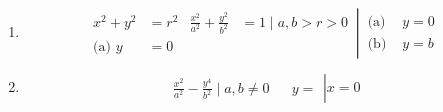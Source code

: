 \documentclass[12pt, A4]{report}
\begin{document}
\begin{enumerate}
\[\begin{aligned}
						\end{aligned}\,\right|\, x = 0
					\]
				\item
					\[
						\left.\begin{aligned}
							x^2 + y^2 &= r^2 & 
								\frac{x^2}{a^2} + \frac{y^2}{b^2} &= 1 
								\mid a, b > r > 0\\
							\text{(a) } y &= 0
						\end{aligned}\,\right|\,
						\begin{aligned}
							\text{(a) } &y = 0 \\
							\text{(b) } &y = b
						\end{aligned}
					\]
				\item
					\[
						\left.\begin{aligned}
							\frac{x^2}{a^2} - \frac{y^4}{b^2} \mid a, b \ne 0 &&
								y = 
						\end{aligned}\right| x = 0
					\]
			\end{enumerate}
			\newpage
\end{document}
